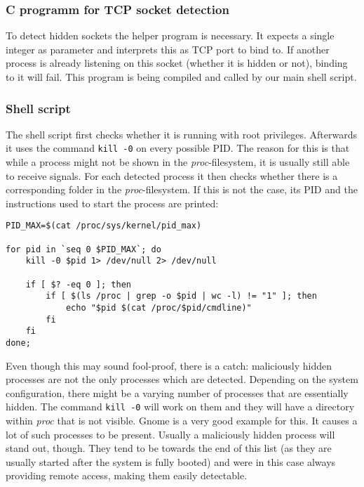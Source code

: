 \documentclass[10pt, letterpaper]{scrartcl}
\begin{document}
\subsubsection{C programm for TCP socket detection}
To detect hidden sockets the helper program is necessary.
It expects a single integer as parameter and interprets this as TCP port to bind to.
If another process is already listening on this socket (whether it is hidden or not), binding to it will fail.
This program is being compiled and called by our main shell script.

\subsubsection{Shell script}
The shell script first checks whether it is running with root privileges.
Afterwards it uses the command \texttt{kill -0} on every possible PID.
The reason for this is that while a process might not be shown in the \emph{proc}-filesystem, it is usually still able to receive signals.
For each detected process it then checks whether there is a corresponding folder in the \emph{proc}-filesystem.
If this is not the case, its PID and the instructions used to start the process are printed:

\begin{lstlisting}
PID_MAX=$(cat /proc/sys/kernel/pid_max)

for pid in `seq 0 $PID_MAX`; do
	kill -0 $pid 1> /dev/null 2> /dev/null
	
	if [ $? -eq 0 ]; then
		if [ $(ls /proc | grep -o $pid | wc -l) != "1" ]; then
			echo "$pid $(cat /proc/$pid/cmdline)"
		fi
	fi
done;
\end{lstlisting}

Even though this may sound fool-proof, there is a catch: maliciously hidden processes are not the only processes which are detected.
Depending on the system configuration, there might be a varying number of processes that are essentially hidden.
The command \texttt{kill -0} will work on them and they will have a directory within \emph{proc} that is not visible.
Gnome is a very good example for this.
It causes a lot of such processes to be present.
Usually a maliciously hidden process will stand out, though.
They tend to be towards the end of this list (as they are usually started after the system is fully booted) and were in this case always providing remote access, making them easily detectable.
\end{document}
